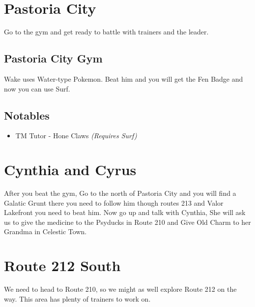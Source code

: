 \documentclass[11pt]{article}
\begin{document}




\section{Pastoria City}\label{sec:pastoria-city}
Go to the gym and get ready to battle with trainers and the leader.

\subsection{Pastoria City Gym}\label{subsec:pastoria-city-gym}
Wake uses Water-type Pokemon.
Beat him and you will get the Fen Badge and now you can use Surf.

\subsection{Notables}\label{subsec:notables-pastoria-city}

\begin{itemize}
    \item TM Tutor - Hone Claws \emph{(Requires Surf)}
\end{itemize}

\section{Cynthia and Cyrus}\label{sec:cynthia-and-cyrus}
After you beat the gym, Go to the north of Pastoria City
and you will find a Galatic Grunt there you need to follow him though routes 213
and Valor Lakefront you need to beat him.
Now go up and talk with Cynthia, She will ask us to give the medicine to the
Psyducks in Route 210 and Give Old Charm to her Grandma in Celestic Town.




\section{Route 212 South}\label{sec:route-212-(south)}
We need to head to Route 210, so we might as well explore Route 212 on the way.
This area has plenty of trainers to work on.




\end{document}
